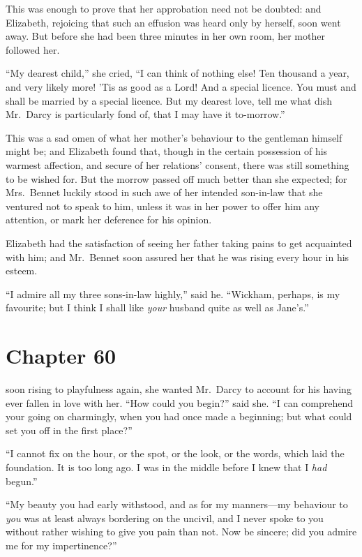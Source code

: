 This was enough to prove that her approbation need not be
doubted: and Elizabeth, rejoicing that such an effusion was
heard only by herself, soon went away.  But before she had
been three minutes in her own room, her mother followed her.

``My dearest child,'' she cried, ``I can think of nothing else!
Ten thousand a year, and very likely more!  'Tis as good as a
Lord!  And a special licence.  You must and shall be married
by a special licence.  But my dearest love, tell me what dish
Mr.\ Darcy is particularly fond of, that I may have it to-morrow.''

This was a sad omen of what her mother's behaviour to the
gentleman himself might be; and Elizabeth found that, though in
the certain possession of his warmest affection, and secure of
her relations' consent, there was still something to be wished
for.  But the morrow passed off much better than she expected;
for Mrs.\ Bennet luckily stood in such awe of her intended
son-in-law that she ventured not to speak to him, unless it was
in her power to offer him any attention, or mark her deference
for his opinion.

Elizabeth had the satisfaction of seeing her father taking
pains to get acquainted with him; and Mr.\ Bennet soon assured
her that he was rising every hour in his esteem.

``I admire all my three sons-in-law highly,'' said he.  ``Wickham,
perhaps, is my favourite; but I think I shall like \emph{your} husband
quite as well as Jane's.''



\chapter{Chapter 60}


 soon rising to playfulness again, she
wanted Mr.\ Darcy to account for his having ever fallen in love
with her.  ``How could you begin?'' said she.  ``I can comprehend
your going on charmingly, when you had once made a beginning;
but what could set you off in the first place?''

``I cannot fix on the hour, or the spot, or the look, or the
words, which laid the foundation.  It is too long ago.  I was
in the middle before I knew that I \emph{had} begun.''

``My beauty you had early withstood, and as for my manners---my
behaviour to \emph{you} was at least always bordering on the uncivil,
and I never spoke to you without rather wishing to give you pain
than not.  Now be sincere; did you admire me for my impertinence?''


